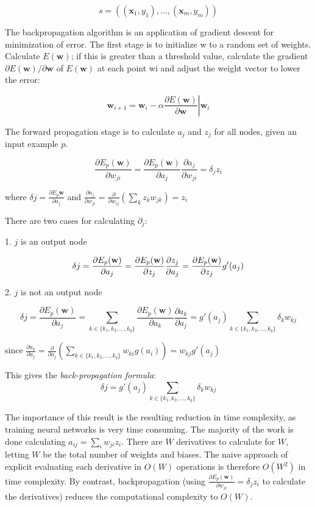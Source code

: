 \documentclass[12pt,a4,notitlepage]{report}
\renewcommand{\_}{\texttt{\symbol{95}}}
\newcommand{\<}{\texttt{\symbol{60}}}
\renewcommand{\>}{\texttt{\symbol{62}}}
\begin{document}
\[ s = ((\mathbf x_1,y_1), ... , (\mathbf x_m, y_m)) \]

The backpropagation algorithm is an application of gradient descent for minimization of error. The first stage is to initialize w to a random set of weights. Calculate $E (\mathbf w)$; if this is greater than a threshold value, calculate the gradient $\partial E (\mathbf w) / \partial \mathbf w $ of $E(\mathbf w )$ at each point wi and adjust the weight vector to lower the error:

\[
\mathbf w_{i+1} = \mathbf w_i - \alpha \left. \frac {\partial E(\mathbf w)} {\partial \mathbf w} \right| \mathbf w_i
\]

The forward propagation stage is to calculate $a_j$ and $z_j$ for all nodes, given an input example $p$.

\[
\frac {\partial E_p(\mathbf w)} {\partial w_{ji}} = \frac {\partial E_p(\mathbf w)} {\partial a_j} \frac {\partial a_j} {\partial w_{ji}} = \delta_j z_i
\]

where $\delta j = \frac {\partial E_p\mathbf w} {\partial a_j}$
and $ \frac {\partial a_j} {\partial w_{ji}} = \frac {\partial} {\partial w_{ij}} \left( \sum_k {z_kw_{jk}} \right) = z_i$

There are two cases for calculating $\partial_j$:

1. $j$ is an output node

\[
\delta j = \frac {\partial E_p (\mathbf w)} {\partial a_j} \\
 = \frac {\partial E_p (\mathbf w)} {\partial z_j} \frac {\partial z_j} {\partial a_j} \\
 = \frac {\partial E_p (\mathbf w)} {\partial z_j}  g'(a_j)
\]

2. $j$ is not an output node

\[
\delta j = \frac {\partial E_p (\mathbf w)} {\partial a_j}
 = \sum_{k \in \{k_1, k_2,\ldots,k_q\}} \frac {\partial E_p (\mathbf w)} {\partial a_k} \frac {\partial a_k} {\partial a_j}
 = g'(a_j) \sum_{k \in \{k_1, k_2,\ldots,k_q\}} {\delta_k w_{kj}}
\]

since $ \frac {\partial a_k} {\partial a_j} = \frac {\partial} {\partial a_j} \left( \sum_{k \in \{k_1, k_2,\ldots,k_q\}} { w_{ki} g(a_i) } \right) = w_{kj} g'(a_j) $

This gives the \textit{back-propagation formula}\cite{NeuralPat}:
\[
\delta j = g'(a_j) \sum_{k \in \{k_1, k_2,\ldots,k_q\}} {\delta_k w_{kj}}
\]

The importance of this result is the resulting reduction in time complexity, as training neural networks is very time consuming. The majority of the work is done calculating $a_{ij} = \sum_i {w_{ji}z_i}$. There are $W$ derivatives to calculate for $W$, letting $W$ be the total number of weights and biases. The naive approach of explicit evaluating each derivative in $O(W)$ operations is therefore $O(W^2)$ in time complexity. By contrast,  backpropagation (using $\frac {\partial E_p(\mathbf w)} {\partial w_{ji}} = \delta_j z_i$ to calculate the derivatives) reduces the computational complexity to $O(W)$.
\end{document}
